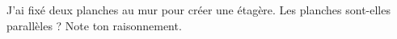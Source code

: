 %
%
    J'ai fixé deux planches au mur pour créer une étagère. Les planches sont-elles parallèles ? Note ton raisonnement.
    \begin{center}
        
    \end{center}
